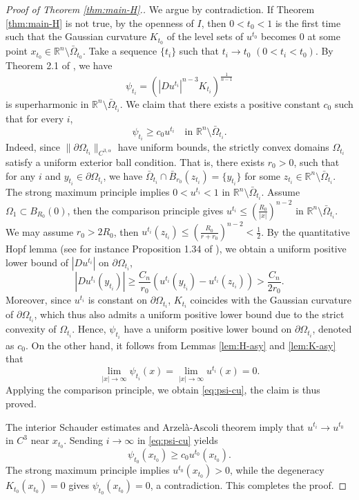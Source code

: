 \documentclass[reqno]{amsart}
\theoremstyle{remark}
\theoremstyle{definition}
\numberwithin{equation}{section}
\begin{document}
\begin{proof}[Proof of Theorem \ref{thm:main-H}.]
	We argue by contradiction.  If Theorem \ref{thm:main-H} is not true, by the openness of $I$, then $0<t_0<1$ is the first time such that the  Gaussian curvature $K_{t_0}$ of the level sets of $u^{t_0}$ becomes $0$ at some point $x_{t_0}\in\mathbb{R}^n\setminus\bar{\Omega}_{t_0}$. Take a sequence $\{t_i\}$ such that $t_i\to t_0$ $(0<t_i<t_0)$. By Theorem 2.1 of \cite{Ma-Zhang-2021}, we have
	$$\psi_{t_i}=(|Du^{t_i}|^{n-3}K_{t_i})^{\frac{1}{n-1}}$$
	is superharmonic in $\mathbb{R}^n\setminus\bar{\Omega}_{t_i}$. 
	We claim that there exists a positive constant $c_0$ such that for every $i$,
	\begin{equation}\label{eq:psi-cu}
		\psi_{t_i}\geq c_0u^{t_i}\quad\text{in }\mathbb{R}^n\setminus\bar{\Omega}_{t_i}.
	\end{equation}
	Indeed, since $\|\partial\Omega_{t_i}\|_{C^{3,\alpha}}$ have uniform bounds, the strictly convex domains $\Omega_{t_i}$ satisfy a uniform exterior ball condition. That is, there exists $r_0>0$, such that for any $i$ and $y_{t_i}\in\partial\Omega_{t_i}$, we have $\bar{\Omega}_{t_i}\cap\bar{B}_{r_0}(z_{t_i})=\{y_{t_i}\}$ for some $z_{t_i}\in\mathbb{R}^n\setminus\bar{\Omega}_{t_i}$. The strong maximum principle implies $0<u^{t_i}<1$ in $\mathbb{R}^n\setminus\bar{\Omega}_{t_i}$. Assume $\Omega_1\subset B_{R_0}(0)$, then the comparison principle gives $u^{t_i}\leq (\frac{R_0}{|x|})^{n-2}$ in $\mathbb{R}^n \setminus \bar{\Omega}_{t_i}$. 
	We may assume $r_0>2R_0$, then $u^{t_i}(z_{t_i})\leq(\frac{R_0}{r+r_0})^{n-2}<\frac{1}{2}$. By the quantitative Hopf lemma (see for instance Proposition 1.34 of \cite{Han-Lin}), we obtain a uniform positive lower bound of $|Du^{t_i}|$ on $\partial\Omega_{t_i}$,
	$$|Du^{t_i}(y_{t_i})|\geq\frac{C_n}{r_0}(u^{t_i}(y_{t_i})-u^{t_i}(z_{t_i}))>\frac{C_n}{2r_0}.$$
	 Moreover, since $u^{t_i}$ is constant on $\partial\Omega_{t_i}$, $K_{t_i}$ coincides with the Gaussian curvature of $\partial\Omega_{t_i}$, which thus also admits a uniform positive lower bound due to the strict convexity of $\Omega_{t_i}$. Hence, $\psi_{t_i}$ have a uniform positive lower bound on $\partial\Omega_{t_i}$, denoted as $c_0$. On the other hand, it follows from Lemmas \ref{lem:H-asy} and \ref{lem:K-asy} that
	 $$\lim_{|x|\to\infty}\psi_{t_i}(x)=\lim_{|x|\to\infty}u^{t_i}(x)=0.$$
	Applying the comparison principle, we obtain \eqref{eq:psi-cu}, the claim is thus proved.

	The interior Schauder estimates and Arzel\`{a}-Ascoli theorem imply that $u^{t_i} \to u^{t_0}$ in $C^3$ near $x_{t_0}$.
	Sending  $i \to \infty$ in \eqref{eq:psi-cu} yields
	$$\psi_{t_0}(x_{t_0}) \ge c_0 u^{t_0}(x_{t_0}).$$
	The strong maximum principle implies $u^{t_0}(x_{t_0}) > 0$, while the degeneracy $K_{t_0}(x_{t_0}) = 0$ gives $\psi_{t_0}(x_{t_0}) = 0$, a contradiction. This completes the proof.
\end{proof}
\end{document}
